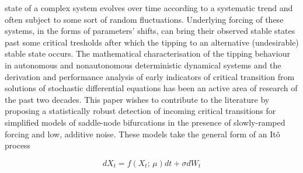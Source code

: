 \documentclass[openacc]{rsproca_new}
\begin{document}
\maketitle

\noindent
state of a complex system evolves over time according to a systematic trend and often subject to some sort of random fluctuations.
Underlying forcing of these systems, in the forms of parameters' shifts, can bring their observed stable states past some critical tresholds after which the tipping to an alternative (undesirable) stable state occurs.
The mathematical characterisation of the tipping behaviour in autonomous and nonautonomous deterministic dynamical systems and the derivation and performance analysis of early indicators of critical transition from solutions of stochastic differential equations has been an active area of research of the past two decades.
This paper wishes to contribute to the literature by proposing a statistically robust detection of incoming critical transitions for simplified models of saddle-node bifurcations in the presence of slowly-ramped forcing and low, additive noise.
These models take the general form of an It\^{o} process

\begin{equation}\label{eq:initial_sde}
     dX_{t} = f(X_t;\,\mu)dt + \sigma dW_{t}
\end{equation}
\end{document}
